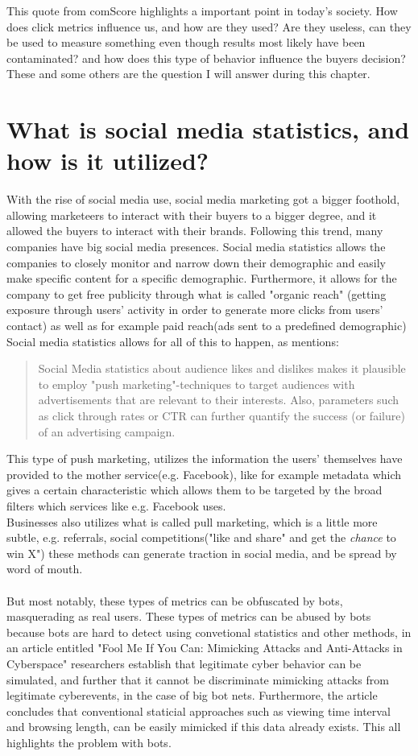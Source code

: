 This quote from comScore highlights a important point in today's society. How does click metrics influence us, and how are they used? Are they useless, can they be used to measure something even though results most likely have been contaminated? and how does this type of behavior influence the buyers decision? These and some others are the question I will answer during this chapter. 


\section{What is  social media statistics, and how is it utilized?}\label{intro:howUtilized}
With the rise of social media use, social media marketing got a bigger foothold, allowing marketeers to interact with their buyers to a bigger degree, and it allowed the buyers to interact with their brands. Following this trend, many companies have big social media presences. Social media statistics allows the companies to closely monitor and narrow down their demographic and easily make specific content for a specific demographic. Furthermore, it allows for the company to get free publicity through what is called "organic reach" (getting exposure through users' activity in order to generate more clicks from users' contact) as well as for example paid reach(ads sent to a predefined demographic)
Social media statistics allows for all of this to happen, as \cite{Singh2013} mentions:
\begin{quotation}
Social Media statistics about audience likes and dislikes makes it plausible to employ "push marketing"-techniques to target audiences with advertisements that are relevant to their interests. Also, parameters such as click through rates or CTR can further quantify the success (or failure) of an advertising campaign. 
\end{quotation}
This type of push marketing, utilizes the information the users' themselves have provided to the mother service(e.g. Facebook), like for example metadata which gives a certain characteristic which allows them to be targeted by the broad filters which services like e.g. Facebook uses. 
\\
Businesses also utilizes what is called pull marketing, which is a little more subtle, e.g. referrals, social competitions("like and share" and get the \textit{chance} to win X") these methods can generate traction in social media, and be spread by word of mouth. 
\\
\\
But most notably, these types of metrics can be obfuscated by bots, masquerading as real users. These types of metrics can be abused by bots because bots are hard to detect using convetional statistics and other methods, in an article entitled "Fool Me If You Can: Mimicking Attacks and Anti-Attacks in Cyberspace" \cite{6601602} researchers establish that legitimate cyber behavior can be simulated, and further that it cannot be discriminate mimicking attacks from legitimate cyberevents, in the case of big bot nets. Furthermore, the article concludes that conventional staticial approaches such as viewing time interval and browsing length, can be easily mimicked if this data already exists. This all highlights the problem with bots.


